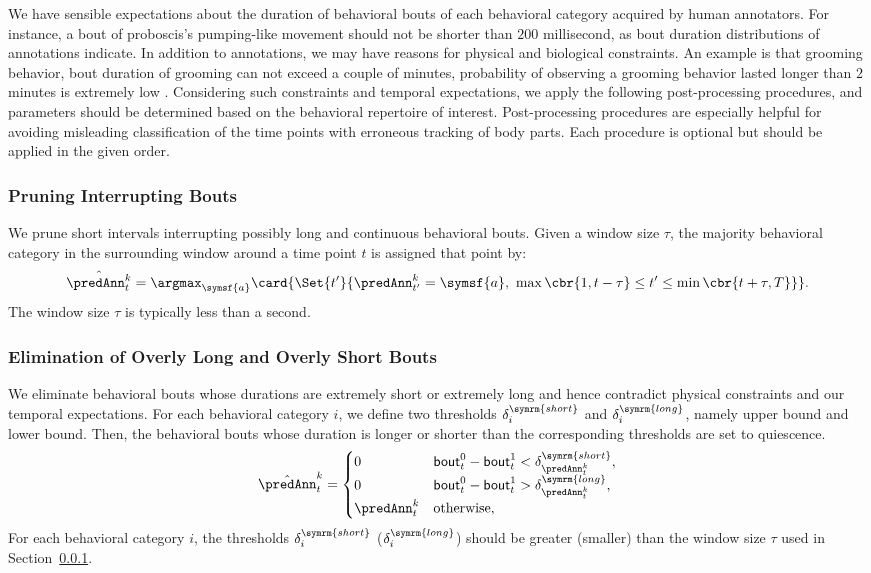 We have sensible expectations about the duration of behavioral bouts of each behavioral category acquired by human annotators.
For instance, a bout of proboscis's pumping-like movement should not be shorter than $200$ millisecond, as bout duration distributions of annotations indicate.
In addition to annotations, we may have reasons for physical and biological constraints.
An example is that grooming behavior, bout duration of grooming can not exceed a couple of minutes, probability of observing a grooming behavior lasted longer than $2$ minutes is extremely low \citep{qiao_automated_2018}.
Considering such constraints and temporal expectations, we apply the following post-processing procedures, and parameters should be determined based on the behavioral repertoire of interest.
Post-processing procedures are especially helpful for avoiding misleading classification of the time points with erroneous tracking of body parts.
Each procedure is optional but should be applied in the given order.

\subsubsection{Pruning Interrupting Bouts}\label{section:pruning-interrupting-bouts}
We prune short intervals interrupting possibly long and continuous behavioral bouts.
Given a window size $\tau$, the majority behavioral category in the surrounding window around a time point $t$ is assigned that point by:
\begin{equation}
	\hat{\predAnn^k_t} = \argmax_{\symsf{a}} \card{\Set{t^\prime}{\predAnn^k_{t^\prime}=\symsf{a}, \ \max\cbr{1, t-\tau} \leq t^\prime \leq \min\cbr{t+\tau, T}}}.
\end{equation}
The window size $\tau$ is typically less than a second.

\subsubsection{Elimination of Overly Long and Overly Short Bouts}
We eliminate behavioral bouts whose durations are extremely short or extremely long and hence contradict physical constraints and our temporal expectations.
For each behavioral category $i$, we define two thresholds $\delta^{\symrm{short}}_i$ and $\delta^{\symrm{long}}_i$, namely upper bound and lower bound.
Then, the behavioral bouts whose duration is longer or shorter than the corresponding thresholds are set to quiescence.
\begin{equation}
	\hat{\predAnn}^k_t=
	\begin{cases}
		0            & \mathsf{bout}^0_t - \mathsf{bout}^1_t < \delta^{\symrm{short}}_{\predAnn^k_t}, \\
		0            & \mathsf{bout}^0_t - \mathsf{bout}^1_t > \delta^{\symrm{long}}_{\predAnn^k_t},  \\
		\predAnn^k_t & \textnormal{otherwise},
	\end{cases}
\end{equation}
For each behavioral category $i$, the thresholds $\delta^{\symrm{short}}_i$ ($\delta^{\symrm{long}}_i$) should be greater (smaller) than the window size $\tau$ used in Section~\ref{section:pruning-interrupting-bouts}.

